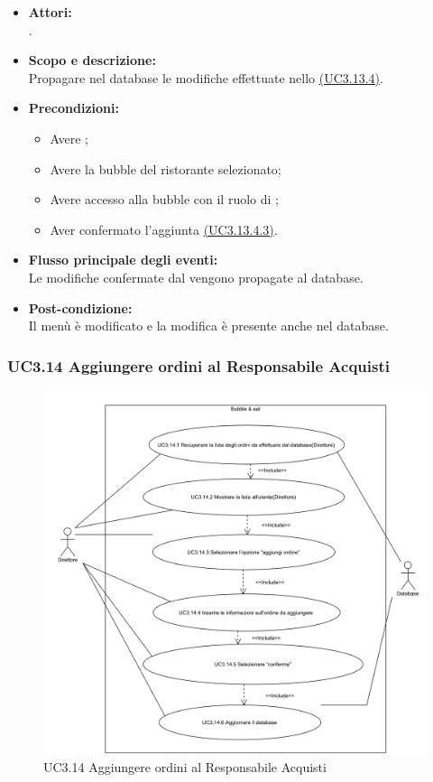 \begin{itemize}
	\item \textbf{Attori:}
	\\.
	\item \textbf{Scopo e descrizione:} 
	\\Propagare nel database le modifiche effettuate nello \hyperref[UC3.13.4]{(UC3.13.4)}.
	\item \textbf{Precondizioni:}
	\begin{itemize}
		\item Avere ;
		\item Avere la bubble del ristorante selezionato;
		\item Avere accesso alla bubble con il ruolo di ;
		\item Aver confermato l’aggiunta \hyperref[UC3.13.4.3]{(UC3.13.4.3)}.
	\end{itemize}
	\item \textbf{Flusso principale degli eventi:}
	\\Le modifiche confermate dal  vengono propagate al database.
	\item \textbf{Post-condizione:}
	\\Il menù è modificato e la modifica è presente anche nel database.
\end{itemize}

\subsubsection{UC3.14 Aggiungere ordini al Responsabile Acquisti} \label{UC3.14}

\begin{figure}[H]
	\centering
	\includegraphics[width=15cm]{../../documenti/AnalisiDeiRequisiti/Diagrammi_img/uc3_14.png}
	\caption{UC3.14 Aggiungere ordini al Responsabile Acquisti}
\end{figure}

